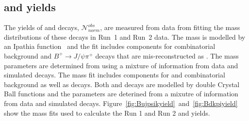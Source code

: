 {{\subsection{\bdkpi and \bujpsik yields}
\label{sec:yeilds}
The yields of \bujpsik and \bdkpi decays, $ \mathcal{N}^{obs}_{norm}$, are measured from data from fitting the mass distributions of these decays in Run~1 and Run~2 data. %
The \bujpsik mass \pdf is modelled by an Ipathia function~\cite{Santos:2013gra} and the fit includes components for combinatorial background and $B^{+} \to J/\psi \pi^{+}$ decays that are mis-reconstructed as \bujpsik. The mass \pdf parameters are determined from using a mixture of information from data and simulated decays. The \bdkpi mass fit includes components for \bskpi and combinatorial background as well as \bdkpi decays. Both \bdkpi and \bskpi decays are modelled by double Crystal Ball functions and the parameters are deterined from a mixutre of information from data and simulated decays. %
Figure~\ref{fig:Bujpsikyield}~and~\ref{fig:Bdkpiyield} show the mass fits used to calculate the Run 1 and Run 2 \bujpsik and \bdkpi yields.





}}
